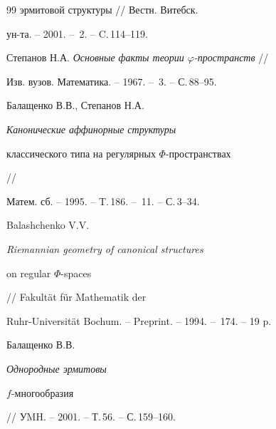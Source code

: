 \begin{thebibliography}{99}
{эрмитовой структуры} // Вестн. Витебск. 


ун-та. -- 2001. -- \No\,2. -- C.\,114--119.




Степанов Н.А. {\em Основные факты теории $\varphi$-пространств} //


Изв. вузов. Математика. -- 1967. -- \No\,3. -- С.\,88--95.




Балащенко В.В., Степанов Н.А. {\em Канонические аффинорные структуры


классического типа на регулярных $\Phi$-пространствах} //


Матем. сб. -- 1995. -- T.\,186. -- \No\,11. -- С.\,3--34.




Balashchenko V.V. {\em Riemannian geometry of canonical structures


on regular $\Phi$-spaces} // Fakult\"at f\"ur Mathematik der


Ruhr-Universit\"at Bochum. -- Preprint. -- 1994. -- \No\,174. -- 19 p.




Балащенко В.В. {\em Однородные эрмитовы


$f$-многообразия} // УMH. -- 2001. -- Т.\,56. -- С.\,159--160.





\end{thebibliography}





\vskip 2cm












\label{end}





